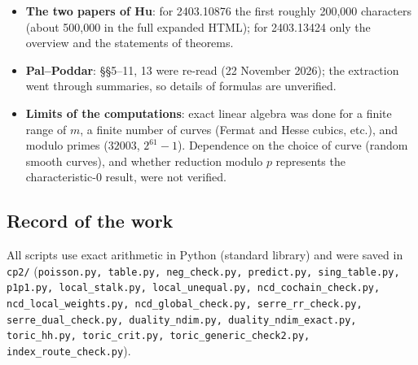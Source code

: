 \begin{itemize}
\item \textbf{The two papers of Hu}: for 2403.10876 the first roughly 200,000 characters (about 500,000 in the full expanded HTML); for 2403.13424 only the overview and the statements of theorems.
\item \textbf{Pal--Poddar}: \S\S5--11, 13 were re-read (22 November 2026); the extraction went through summaries, so details of formulas are unverified.
\item \textbf{Limits of the computations}: exact linear algebra was done for a finite range of $m$, a finite number of curves (Fermat and Hesse cubics, etc.), and modulo primes ($32003$, $2^{61}-1$). Dependence on the choice of curve (random smooth curves), and whether reduction modulo $p$ represents the characteristic-0 result, were not verified.
\end{itemize}

\subsection{Record of the work}
All scripts use exact arithmetic in Python (standard library) and were saved in \texttt{cp2/} (\texttt{poisson.py, table.py, neg\_check.py, predict.py, sing\_table.py, p1p1.py, local\_stalk.py, local\_unequal.py, ncd\_cochain\_check.py, ncd\_local\_weights.py, ncd\_global\_check.py, serre\_rr\_check.py, serre\_dual\_check.py, duality\_ndim.py, duality\_ndim\_exact.py, toric\_hh.py, toric\_crit.py, toric\_generic\_check2.py, index\_route\_check.py}).
